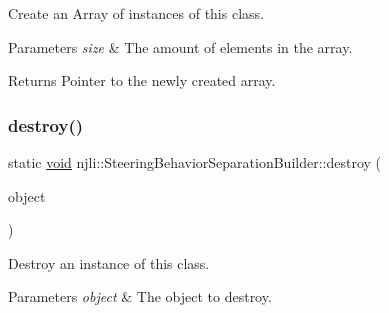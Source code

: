Create an Array of instances of this class.


\begin{DoxyParams}{Parameters}
{\em size} & The amount of elements in the array.\\
\hline
\end{DoxyParams}
\begin{DoxyReturn}{Returns}
Pointer to the newly created array. 
\end{DoxyReturn}
\mbox{\label{classnjli_1_1_steering_behavior_separation_builder_ab4820fd7274ab4bd325f84bba418f63e}} 
\subsubsection{\texorpdfstring{destroy()}{destroy()}}
{\footnotesize\ttfamily static \mbox{\hyperlink{_thread_8h_af1e856da2e658414cb2456cb6f7ebc66}{void}} njli\+::\+Steering\+Behavior\+Separation\+Builder\+::destroy (\begin{DoxyParamCaption}\item[{\mbox{\hyperlink{classnjli_1_1_steering_behavior_separation_builder}{Steering\+Behavior\+Separation\+Builder}} $\ast$}]{object }\end{DoxyParamCaption})\hspace{0.3cm}{\ttfamily [static]}}

Destroy an instance of this class.


\begin{DoxyParams}{Parameters}
{\em object} & The object to destroy. \\
\hline
\end{DoxyParams}
\mbox{\label{classnjli_1_1_steering_behavior_separation_builder_a80448ab44df7279df4931818952d37b3}} 
